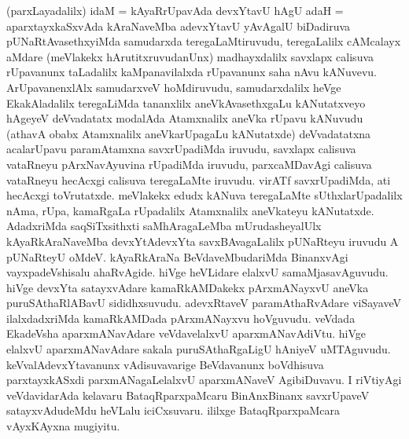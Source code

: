\begin{artha}
(parxLayadalilx) idaM = kAyaRrUpavAda devxYtavU hAgU adaH = aparxtayxkaSxvAda kAraNaveMba adevxYtavU yAvAgalU biDadiruva pUNaRtAvasethxyiMda samudarxda teregaLaMtiruvudu, teregaLalilx cAMcalayx aMdare (meVlakekx hArutitxruvudanUnx) madhayxdalilx savxlapx calisuva rUpavanunx taLadalilx kaMpanavilalxda rUpavanunx saha nAvu kANuvevu. ArUpavanenxlAlx samudarxveV hoMdiruvudu, samudarxdalilx heVge EkakAladalilx teregaLiMda tananxlilx  aneVkAvasethxgaLu kANutatxveyo hAgeyeV deVvadatatx modalAda Atamxnalilx aneVka rUpavu kANuvudu (athavA obabx Atamxnalilx aneVkarUpagaLu kANutatxde) deVvadatatxna acalarUpavu paramAtamxna savxrUpadiMda  iruvudu, savxlapx calisuva vataRneyu pArxNavAyuvina rUpadiMda iruvudu, parxcaMDavAgi calisuva vataRneyu hecAcxgi calisuva teregaLaMte iruvudu. virATf savxrUpadiMda, ati hecAcxgi toVrutatxde. meVlakekx edudx kANuva teregaLaMte sUthxlarUpadalilx nAma, rUpa, kamaRgaLa rUpadalilx Atamxnalilx aneVkateyu kANutatxde. AdadxriMda saqSiTxsithxti saMhAragaLeMba mUrudasheyalUlx kAyaRkAraNaveMba devxYtAdevxYta savxBAvagaLalilx pUNaRteyu iruvudu A pUNaRteyU oMdeV. kAyaRkAraNa BeVdaveMbudariMda BinanxvAgi vayxpadeVshisalu ahaRvAgide. hiVge heVLidare elalxvU samaMjasavAguvudu. hiVge devxYta satayxvAdare kamaRkAMDakekx pArxmANayxvU aneVka puruSAthaRlABavU sididhxsuvudu. adevxRtaveV paramAthaRvAdare viSayaveV ilalxdadxriMda kamaRkAMDada pArxmANayxvu hoVguvudu. veVdada EkadeVsha aparxmANavAdare veVdavelalxvU aparxmANavAdiVtu. hiVge elalxvU aparxmANavAdare sakala puruSAthaRgaLigU hAniyeV uMTAguvudu. keVvalAdevxYtavanunx vAdisuvavarige BeVdavanunx boVdhisuva parxtayxkASxdi parxmANagaLelalxvU aparxmANaveV AgibiDuvavu. I riVtiyAgi veVdavidarAda kelavaru BataqRparxpaMcaru BinAnxBinanx savxrUpaveV satayxvAdudeMdu heVLalu iciCxsuvaru. ililxge BataqRparxpaMcara vAyxKAyxna mugiyitu. 
\end{artha}


